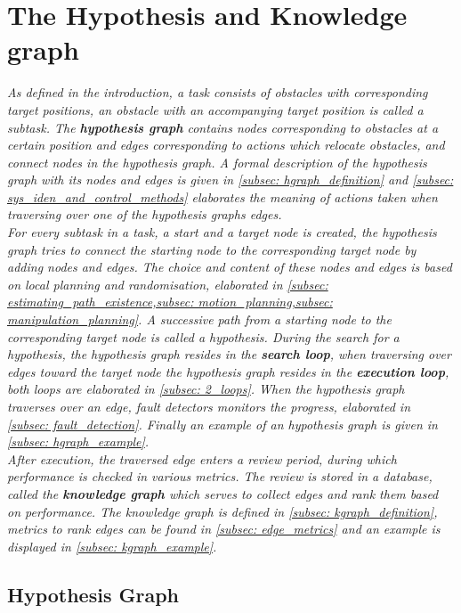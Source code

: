\chapter{The Hypothesis and Knowledge graph}
\textit{
As defined in the introduction, a task consists of obstacles with corresponding target positions, an obstacle with an accompanying target position is called a subtask. The \textbf{hypothesis graph} contains nodes corresponding to obstacles at a certain position and edges corresponding to actions which relocate obstacles, and connect nodes in the hypothesis graph. A formal description of the hypothesis graph with its nodes and edges is given in \cref{subsec: hgraph_definition} and \cref{subsec: sys_iden_and_control_methods} elaborates the meaning of actions taken when traversing over one of the hypothesis graphs edges.\\
\newline
For every subtask in a task, a start and a target node is created, the hypothesis graph tries to connect the starting node to the corresponding target node by adding nodes and edges. The choice and content of these nodes and edges is based on local planning and randomisation, elaborated in \cref{subsec: estimating_path_existence,subsec: motion_planning,subsec: manipulation_planning}. A successive path from a starting node to the corresponding target node is called a hypothesis. During the search for a hypothesis, the hypothesis graph resides in the \textbf{search loop}, when traversing over edges toward the target node the hypothesis graph resides in the \textbf{execution loop}, both loops are elaborated in \cref{subsec: 2_loops}. When the hypothesis graph traverses over an edge, fault detectors monitors the progress, elaborated in \cref{subsec: fault_detection}. Finally an example of an hypothesis graph is given in \cref{subsec: hgraph_example}.\\
\newline
After execution, the traversed edge enters a review period, during which performance is checked in various metrics. The review is stored in a database, called the \textbf{knowledge graph} which serves to collect edges and rank them based on performance. The knowledge graph is defined in \cref{subsec: kgraph_definition}, metrics to rank edges can be found in \cref{subsec: edge_metrics} and an example is displayed in \cref{subsec: kgraph_example}.
}

\newpage

\section{Hypothesis Graph}


